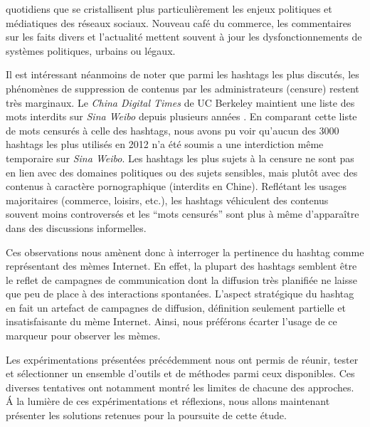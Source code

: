 quotidiens que se cristallisent plus particulièrement les enjeux politiques et médiatiques des réseaux sociaux. Nouveau café du commerce, les commentaires sur les faits divers et l{\textquoteright}actualité mettent souvent à jour les dysfonctionnements de systèmes politiques, urbains ou légaux. 

Il est intéressant néanmoins de noter que parmi les hashtags les plus discutés, les phénomènes de suppression de contenus par les administrateurs (censure) restent très marginaux. Le \textit{China Digital Times} de UC Berkeley maintient une liste des mots interdits sur \textit{Sina Weibo} depuis plusieurs années \citep{Ng2013}. En comparant cette liste de mots censurés à celle des hashtags, nous avons pu voir qu{\textquoteright}aucun des 3000 hashtags les plus utilisés en 2012 n{\textquoteright}a été soumis a une interdiction m\^eme temporaire sur \textit{Sina Weibo}. Les hashtags les plus sujets à la censure ne sont pas en lien avec des domaines politiques ou des sujets sensibles, mais plut\^ot avec des contenus à caractère pornographique (interdits en Chine). Reflétant les usages majoritaires (commerce, loisirs, etc.), les hashtags véhiculent des contenus souvent moins controversés et les {\textquotedblleft}mots censurés{\textquotedblright} sont plus à m\^eme d{\textquoteright}appara\^itre dans des discussions informelles.

Ces observations nous amènent donc à interroger la pertinence du hashtag comme représentant des mèmes Internet. En effet, la plupart des hashtags semblent être le reflet de campagnes de communication dont la diffusion très planifiée ne laisse que peu de place à des interactions spontanées. L'aspect stratégique du hashtag en fait un artefact de campagnes de diffusion, définition seulement partielle et insatisfaisante du mème Internet.  Ainsi, nous préférons écarter l'usage de ce marqueur pour observer les mèmes.

\bigskip

Les expérimentations présentées précédemment nous ont permis de réunir, tester et sélectionner un ensemble d'outils et de méthodes parmi ceux disponibles. Ces diverses tentatives ont notamment montré les limites de chacune des approches. \'A la lumière de ces expérimentations et réflexions, nous allons maintenant présenter les solutions retenues pour la poursuite de cette étude.
